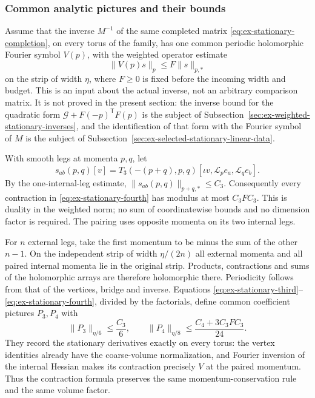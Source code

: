 \subsubsection{Common analytic pictures and their bounds}
Assume that the inverse $M^{-1}$ of the same completed matrix
\eqref{eq:ex-stationary-completion}, on every torus of the family, has
one common periodic holomorphic Fourier symbol $V(p)$, with the weighted
operator estimate
\begin{equation}\label{eq:ex-exchange-inverse}
                 \|V(p)s\|_p\leq F\|s\|_{p,*}
\end{equation}
on the strip of width $\eta$, where $F\geq0$ is fixed before the
incoming width and budget. This is an input about the actual inverse,
not an arbitrary comparison matrix. It is not proved in the present
section: the inverse bound for the quadratic form
$\mathcal G+F(-p)^{\mathsf T}F(p)$ is the subject of
Subsection~\ref{sec:ex-weighted-stationary-inverses}, and the
identification of that form with the Fourier symbol of $M$ is the
subject of Subsection~\ref{sec:ex-selected-stationary-linear-data}.

With smooth legs at momenta $p,q$, let
\[
 s_{ab}(p,q)[v]
   =T_3(-(p+q),p,q)[\iota v,\mathcal L_pe_a,\mathcal L_qe_b].
\]
By the one-internal-leg estimate,
$\|s_{ab}(p,q)\|_{p+q,*}\leq C_3$. Consequently every contraction
in \eqref{eq:ex-stationary-fourth} has modulus at most $C_3FC_3$.
This is duality in the weighted norm; no sum of coordinatewise bounds
and no dimension factor is required. The pairing uses opposite momenta
on its two internal legs.

For $n$ external legs, take the first momentum to be minus the sum of
the other $n-1$. On the independent strip of width $\eta/(2n)$ all
external momenta and all paired internal momenta lie in the original
strip. Products, contractions and sums of the holomorphic arrays are
therefore holomorphic there. Periodicity follows from that of the
vertices, bridge and inverse. Equations
\eqref{eq:ex-stationary-third}--\eqref{eq:ex-stationary-fourth}, divided
by the factorials, define common coefficient pictures $P_3,P_4$ with
\begin{equation}\label{eq:ex-classical-picture-prices}
       \|P_3\|_{\eta/6}\leq\frac{C_3}{6},\qquad
       \|P_4\|_{\eta/8}\leq\frac{C_4+3C_3FC_3}{24}.
\end{equation}
They record the stationary derivatives exactly on every torus: the
vertex identities already have the coarse-volume normalization, and
Fourier inversion of the internal Hessian makes its contraction precisely
$V$ at the paired momentum. Thus the contraction formula preserves the
same momentum-conservation rule and the same volume factor.

